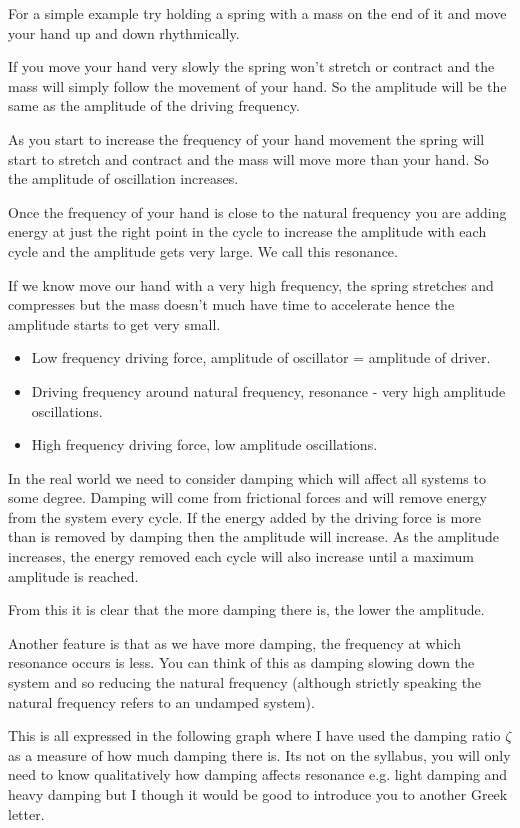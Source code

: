 \documentclass[revision-guide.tex]{subfiles}
\begin{document}
For a simple example try holding a spring with a mass on the end of it and move your hand up and down rhythmically.

If you move your hand very slowly the spring won't stretch or contract and the mass will simply follow the movement of your hand. So the amplitude will be the same as the amplitude of the driving frequency.

As you start to increase the frequency of your hand movement the spring will start to stretch and contract and the mass will move more than your hand. So the amplitude of oscillation increases.

Once the frequency of your hand is close to the natural frequency you are adding energy at just the right point in the cycle to increase the amplitude with each cycle and the amplitude gets very large. We call this resonance.

If we know move our hand with a very high frequency, the spring stretches and compresses but the mass doesn't much have time to accelerate hence the amplitude starts to get very small.


\begin{itemize}
\item Low frequency driving force, amplitude of oscillator = amplitude of driver.
\item Driving frequency around natural frequency, resonance - very high amplitude oscillations.
\item High frequency driving force, low amplitude oscillations.
\end{itemize}



In the real world we need to consider damping which will affect all systems to some degree. Damping will come from frictional forces and will remove energy from the system every cycle. If the energy added by the driving force is more than is removed by damping then the amplitude will increase. As the amplitude increases, the energy removed each cycle will also increase until a maximum amplitude is reached.

From this it is clear that the more damping there is, the lower the amplitude. 

Another feature is that as we have more damping, the frequency at which resonance occurs is less. You can think of this as damping slowing down the system and so reducing the natural frequency (although strictly speaking the natural frequency refers to an undamped system).


This is all expressed in the following graph where I have used the damping ratio $\zeta$ as a measure of how much damping there is. Its not on the syllabus, you will only need to know qualitatively how damping affects resonance e.g. light damping and heavy damping but I though it would be good to introduce you to another Greek letter.
\end{document}
